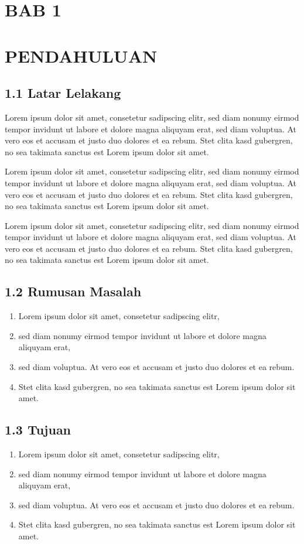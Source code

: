 \begin{center}
    \section{BAB 1}
    \section{PENDAHULUAN}
\end{center}

\subsection{1.1 Latar Lelakang}
Lorem ipsum dolor sit amet, consetetur sadipscing elitr, sed diam nonumy eirmod tempor invidunt ut labore et dolore magna aliquyam erat, sed diam voluptua. At vero eos et accusam et justo duo dolores et ea rebum. Stet clita kasd gubergren, no sea takimata sanctus est Lorem ipsum dolor sit amet.

Lorem ipsum dolor sit amet, consetetur sadipscing elitr, sed diam nonumy eirmod tempor invidunt ut labore et dolore magna aliquyam erat, sed diam voluptua. At vero eos et accusam et justo duo dolores et ea rebum. Stet clita kasd gubergren, no sea takimata sanctus est Lorem ipsum dolor sit amet.

Lorem ipsum dolor sit amet, consetetur sadipscing elitr, sed diam nonumy eirmod tempor invidunt ut labore et dolore magna aliquyam erat, sed diam voluptua. At vero eos et accusam et justo duo dolores et ea rebum. Stet clita kasd gubergren, no sea takimata sanctus est Lorem ipsum dolor sit amet.

\subsection{1.2 Rumusan Masalah}
\begin{enumerate}
    \item Lorem ipsum dolor sit amet, consetetur sadipscing elitr,
    \item sed diam nonumy eirmod tempor invidunt ut labore et dolore magna aliquyam erat,
    \item sed diam voluptua. At vero eos et accusam et justo duo dolores et ea rebum.
    \item Stet clita kasd gubergren, no sea takimata sanctus est Lorem ipsum dolor sit amet.
\end{enumerate}

\subsection{1.3 Tujuan}
\begin{enumerate}
    \item Lorem ipsum dolor sit amet, consetetur sadipscing elitr,
    \item sed diam nonumy eirmod tempor invidunt ut labore et dolore magna aliquyam erat,
    \item sed diam voluptua. At vero eos et accusam et justo duo dolores et ea rebum.
    \item Stet clita kasd gubergren, no sea takimata sanctus est Lorem ipsum dolor sit amet.
\end{enumerate}
